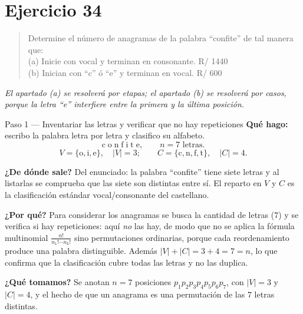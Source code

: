 \documentclass[11pt]{article}
\begin{document}
\section*{Ejercicio 34}

\begin{quote}
Determine el número de anagramas de la palabra ``confite'' de tal manera que:\\[2pt]
(a) Inicie con vocal y terminan en consonante. \hfill R/ 1440\\
(b) Inician con ``c'' ó ``e'' y terminan en vocal. \hfill R/ 600
\end{quote}

\emph{El apartado (a) se resolverá por etapas; el apartado (b) se resolverá por casos, porque la letra ``e'' interfiere entre la primera y la última posición.}

\begin{paso}{Paso 1 --- Inventariar las letras y verificar que no hay repeticiones}
\textbf{Qué hago:} escribo la palabra letra por letra y clasifico su alfabeto.
\[
  \text{c}\;\text{o}\;\text{n}\;\text{f}\;\text{i}\;\text{t}\;\text{e},\qquad n=7 \text{ letras}.
\]
\[
  V=\{\text{o},\text{i},\text{e}\},\quad |V|=3 ;\qquad
  C=\{\text{c},\text{n},\text{f},\text{t}\},\quad |C|=4 .
\]

\textbf{¿De dónde sale?} Del enunciado: la palabra ``confite'' tiene siete letras y al listarlas se comprueba que las siete son distintas entre sí. El reparto en $V$ y $C$ es la clasificación estándar vocal/consonante del castellano.

\textbf{¿Por qué?} Para considerar los anagramas se busca la cantidad de letras ($7$) y se verifica si hay repeticiones: aquí \emph{no} las hay, de modo que no se aplica la fórmula multinomial $\frac{n!}{n_1!\cdots n_k!}$ sino permutaciones ordinarias, porque cada reordenamiento produce una palabra distinguible. Además $|V|+|C|=3+4=7=n$, lo que confirma que la clasificación cubre todas las letras y no las duplica.

\textbf{¿Qué tomamos?} Se anotan $n=7$ posiciones $p_1p_2p_3p_4p_5p_6p_7$, con $|V|=3$ y $|C|=4$, y el hecho de que un anagrama es una permutación de las $7$ letras distintas.
\end{paso}
\end{document}
